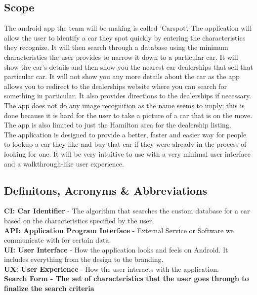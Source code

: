 \documentclass[12pt]{article}
\begin{document}
\subsection{Scope}
The android app the team will be making is called 'Carspot'. The application will allow the user to identify a car they spot quickly by entering the characteristics they recognize. It will then search through a database using the minimum characteristics the user provides to narrow it down to a particular car. It will show the car's details and then show you the nearest car dealerships that sell that particular car. It will not show you any more details about the car as the app allows you to redirect to the dealerships website where you can search for something in particular. It also provides directions to the dealerships if necessary. The app does not do any image recognition as the name seems to imply; this is done because it is hard for the user to take a picture of a car that is on the move. The app is also limited to just the Hamilton area for the dealership listing.\\
The application is designed to provide a better, faster and easier way for people to lookup a car they like and buy that car if they were already in the process of looking for one. It will be very intuitive to use with a very minimal user interface and a walkthrough-like user experience.
\subsection{Definitons, Acronyms \& Abbreviations}
\textbf{CI: Car Identifier} - The algorithm that searches the custom database for a car based on the characteristics specified by the user.\\
\textbf{API: Application Program Interface} - External Service or Software we communicate with for certain data.\\
\textbf{UI: User Interface} - How the application looks and feels on Android. It includes everything from the design to the branding.\\
\textbf{UX: User Experience} - How the user interacts with the application.\\
\textbf{Search Form - The set of characteristics that the user goes through to finalize the search criteria}
\end{document}
